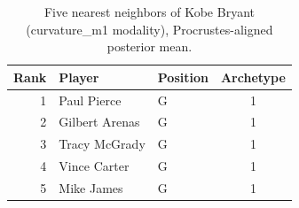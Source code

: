 \begin{table}[htbp]
  \centering\small
  \begin{tabular}{rllc}
    \toprule
    Rank & Player & Position & Archetype \\
    \midrule
    1 & Paul Pierce & G & 1 \\
    2 & Gilbert Arenas & G & 1 \\
    3 & Tracy McGrady & G & 1 \\
    4 & Vince Carter & G & 1 \\
    5 & Mike James & G & 1 \\
    \bottomrule
  \end{tabular}
  \caption{Five nearest neighbors of Kobe Bryant (curvature_m1 modality), Procrustes-aligned posterior mean.}
  \label{tab:Kobe_Bryant_neighbors_curvature_m1}
\end{table}

